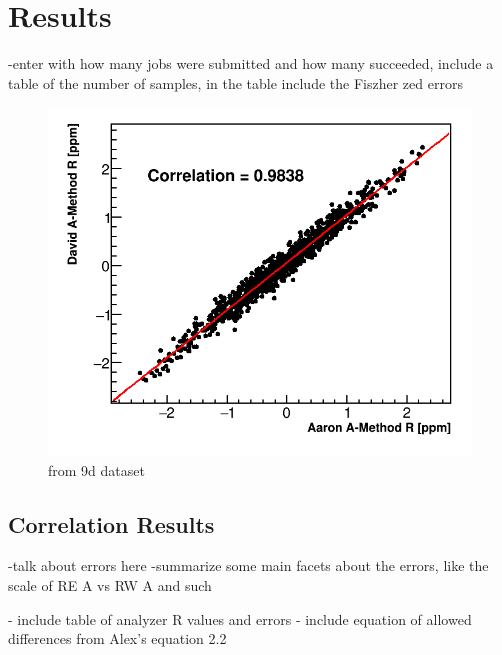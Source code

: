 
\graphicspath{{Body/Figures/Correlations/}}

\section{Results}


-enter with how many jobs were submitted and how many succeeded, include a table of the number of samples, in the table include the Fiszher zed errors


\begin{figure}[]
\centering
\includegraphics[width=\textwidth]{ScatterPlot}
\caption{from 9d dataset}
\label{fig:}
\end{figure}



\subsection{Correlation Results}

-talk about errors here
-summarize some main facets about the errors, like the scale of RE A vs RW A and such

- include table of analyzer R values and errors
- include equation of allowed differences from Alex's equation 2.2


